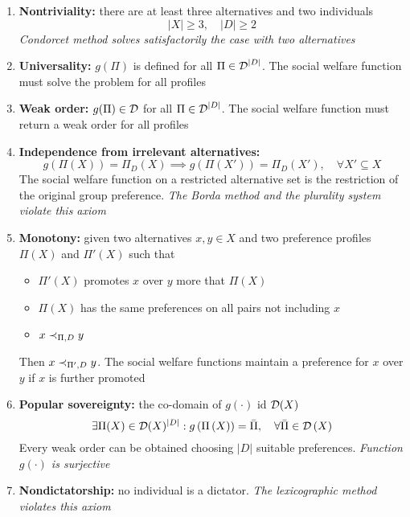 \begin{enumerate}
	\item \textbf{Nontriviality:} there are at least three alternatives and two individuals
	$$ |X| \geq 3, \quad |D| \geq 2 $$
	\textit{Condorcet method solves satisfactorily the case with two alternatives}
	
	\item \textbf{Universality:} $g (\Pi)$ is defined for all $\Pi \in \operatorname{\mathcal{D}}^{|D|}$. The social welfare function must solve the problem for all profiles
	
	\item \textbf{Weak order:} $g(\Pi) \in \operatorname{\mathcal{D}}$ for all $\Pi \in \operatorname{\mathcal{D}}^{|D|}$. The social welfare function must return a weak order for all profiles
	
	\item \textbf{Independence from irrelevant alternatives:}
	$$ g\left(\Pi(X)\right) = \Pi_D \left(X\right) \implies g \left(\Pi \left(X'\right)\right) = \Pi_D \left(X'\right), \quad \forall X' \subseteq X$$
	The social welfare function on a restricted alternative set is the restriction of the original group preference. \textit{The Borda method and the plurality system violate this axiom}
	
	\item \textbf{Monotony:} given two alternatives $x, y \in X$ and two preference profiles $\Pi (X)$ and $\Pi' (X)$ such that
	\begin{itemize}
		\item $\Pi'(X)$ promotes $x$ over $y$ more that $\Pi (X)$
		
		\item $\Pi(X)$ has the same preferences on all pairs not including $x$
		
		\item $x \prec_{\Pi, D} y$
	\end{itemize}
	Then $x \prec_{\Pi', D} y$. The social welfare functions maintain a preference for $x$ over $y$ if $x$ is further promoted
	
	\item \textbf{Popular sovereignty:} the co-domain of $g (\cdot)$ id $\operatorname{\mathcal{D}}(X)$
	$$ \exists \Pi (X) \in \operatorname{\mathcal{D}} (X)^{|D|} : g \left(\Pi \left(X\right)\right) = \bar \Pi, \quad \forall \bar \Pi \in \operatorname{\mathcal{D}} \left(X\right) $$
	Every weak order can be obtained choosing $|D|$ suitable preferences. \textit{Function $g(\cdot)$ is surjective}
	
	\item \textbf{Nondictatorship:} no individual is a dictator. \textit{The lexicographic method violates this axiom}
\end{enumerate}

